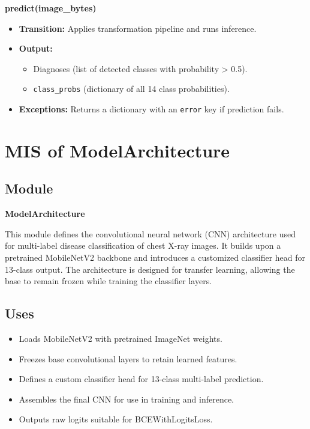 \documentclass[12pt, titlepage]{article}
\begin{document}
\textbf{predict(image\_bytes)}

\begin{itemize}
    \item \textbf{Transition:} Applies transformation pipeline and runs inference.
    \item \textbf{Output:} 
    \begin{itemize}
        \item Diagnoses (list of detected classes with probability > 0.5).
        \item \texttt{class\_probs} (dictionary of all 14 class probabilities).
    \end{itemize}
    \item \textbf{Exceptions:} Returns a dictionary with an \texttt{error} key if prediction fails.
\end{itemize}



\newpage

\section{MIS of ModelArchitecture}
\label{sec:ModelArchitecture}

\subsection{Module}
\label{sec:ModelArchitectureModule}

\textbf{ModelArchitecture}

This module defines the convolutional neural network (CNN) architecture used for multi-label disease classification of chest X-ray images. It builds upon a pretrained MobileNetV2 backbone and introduces a customized classifier head for 13-class output. The architecture is designed for transfer learning, allowing the base to remain frozen while training the classifier layers.

\subsection{Uses}
\label{sec:ModelArchitectureUses}

\begin{itemize}
    \item Loads MobileNetV2 with pretrained ImageNet weights.
    \item Freezes base convolutional layers to retain learned features.
    \item Defines a custom classifier head for 13-class multi-label prediction.
    \item Assembles the final CNN for use in training and inference.
    \item Outputs raw logits suitable for BCEWithLogitsLoss.
\end{itemize}
\end{document}
